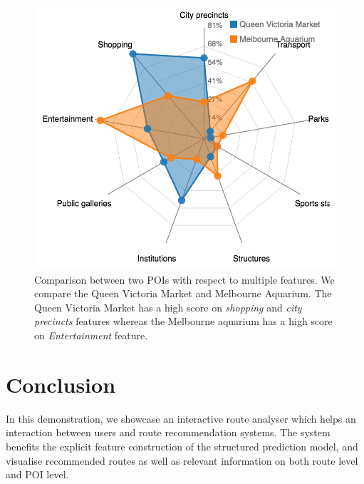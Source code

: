 \documentclass[sigconf]{acmart}
\begin{document}
\begin{figure}[t!]
\includegraphics[width=0.8\linewidth]{figure/sample_radar.png}
\caption{Comparison between two POIs with respect to multiple features. We compare the Queen Victoria Market and Melbourne Aquarium. The Queen Victoria Market has a high score on \textit{shopping} and \textit{city precincts} features whereas the Melbourne aquarium has a high score on \textit{Entertainment} feature.}
\label{fig:radar}
\end{figure}


\section{Conclusion}
In this demonstration, we showcase an interactive route analyser which helps an interaction between users and route recommendation systems. The system benefits the explicit feature construction of the structured prediction model, and visualise recommended routes as well as relevant information on both route level and POI level.


 
\end{document}
